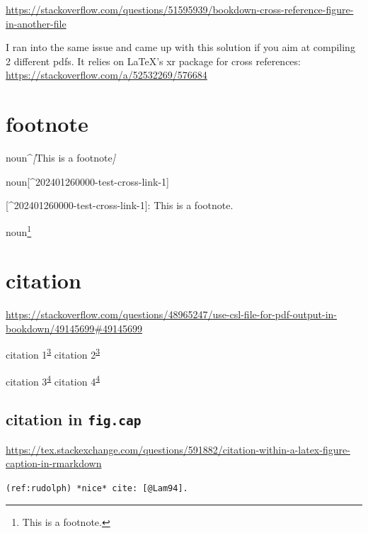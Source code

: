 \documentclass[
]{book}
\newenvironment{Shaded}{\begin{snugshade}}{\end{snugshade}}
\newcommand{\CommentTok}[1]{\textcolor[rgb]{0.56,0.35,0.01}{\textit{#1}}}
\newcommand{\NormalTok}[1]{#1}
\newcommand{\OtherTok}[1]{\textcolor[rgb]{0.56,0.35,0.01}{#1}}
\theoremstyle{definition}
\theoremstyle{definition}
\theoremstyle{definition}
\theoremstyle{definition}
\theoremstyle{remark}
\begin{document}
\url{https://stackoverflow.com/questions/51595939/bookdown-cross-reference-figure-in-another-file}

I ran into the same issue and came up with this solution if you aim at compiling 2 different pdfs. It relies on LaTeX's xr package for cross references: \url{https://stackoverflow.com/a/52532269/576684}

\hypertarget{footnote-1}{%
\section{footnote}\label{footnote-1}}

\begin{Shaded}
\begin{Highlighting}[]
\NormalTok{noun\^{}}\CommentTok{[}\OtherTok{This is a footnote}\CommentTok{]}

\NormalTok{noun}\OtherTok{[\^{}202401260000{-}test{-}cross{-}link{-}1]}

\OtherTok{[\^{}202401260000{-}test{-}cross{-}link{-}1]: }\NormalTok{This is a footnote.}
\end{Highlighting}
\end{Shaded}

noun\footnote{This is a footnote.}

\hypertarget{citation}{%
\section{citation}\label{citation}}

\url{https://stackoverflow.com/questions/48965247/use-csl-file-for-pdf-output-in-bookdown/49145699\#49145699}

citation 1\textsuperscript{\protect\hyperlink{ref-noauthor_bookdown_2019}{3}} citation 2\textsuperscript{\protect\hyperlink{ref-noauthor_bookdown_2019}{3}}

citation 3\textsuperscript{\protect\hyperlink{ref-ccjou2009}{4}} citation 4\textsuperscript{\protect\hyperlink{ref-ccjou2009}{4}}

\hypertarget{citation-in-fig.cap}{%
\subsection{\texorpdfstring{citation in \texttt{fig.cap}}{citation in fig.cap}}\label{citation-in-fig.cap}}

\url{https://tex.stackexchange.com/questions/591882/citation-within-a-latex-figure-caption-in-rmarkdown}

\texttt{(ref:rudolph)\ *nice*\ cite:\ {[}@Lam94{]}.}
\end{document}

